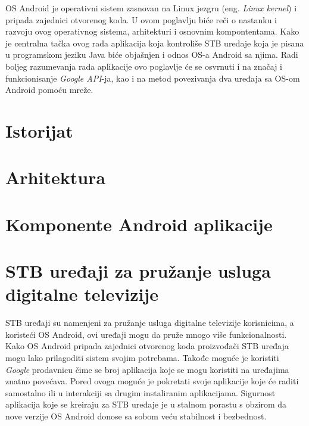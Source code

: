 \documentclass[../TamaraIvanovicMasterRad.tex]{subfiles}
\begin{document}
OS Android je operativni sistem zasnovan na Linux jezgru (eng. \textit{Linux kernel}) i pripada zajednici otvorenog koda. U ovom poglavlju biće reči o nastanku i razvoju ovog operativnog sistema, arhitekturi i osnovnim kompontentama. Kako je centralna tačka ovog rada aplikacija koja kontroliše STB uređaje koja je pisana u programskom jeziku Java biće objašnjen i odnos OS-a Android sa njima. Radi boljeg razumevanja rada aplikacije ovo poglavlje će se osvrnuti i na značaj i funkcionisanje \textit{Google API}-ja, kao i na metod povezivanja dva uređaja sa OS-om Android pomoću mreže. 
\section{Istorijat}



\section{Arhitektura}



\section{Komponente Android aplikacije}


\section{STB uređaji za pružanje usluga digitalne televizije}
STB uređaji su namenjeni za pružanje usluga digitalne televizije korisnicima, a koristeći OS Android, ovi uređaji mogu da pruže mnogo više funkcionalnosti. Kako OS Android pripada zajednici otvorenog koda proizvođači STB uređaja mogu lako prilagoditi sistem svojim potrebama. Takođe moguće je koristiti \textit{Google} prodavnicu čime se broj aplikacija koje se mogu koristiti na uređajima znatno povećava. Pored ovoga moguće je pokretati svoje aplikacije koje će raditi samostalno ili u interakciji sa drugim instaliranim aplikacijama. Sigurnost aplikacija koje se kreiraju za STB uređaje je u stalnom porastu s obzirom da nove verzije OS Android donose sa sobom veću stabilnost i bezbednost. 
\end{document}
